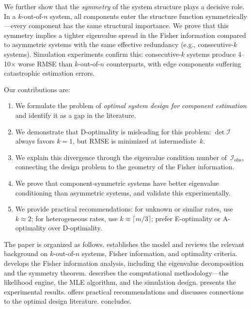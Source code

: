\documentclass[12pt]{article}
\theoremstyle{definition}
\theoremstyle{remark}
\begin{document}
We further show that the \emph{symmetry} of the system structure plays
a decisive role.  In a $k$-out-of-$n$ system, all components enter the
structure function symmetrically---every component has the same
structural importance.  We prove that this symmetry implies a tighter
eigenvalue spread in the Fisher information compared to asymmetric
systems with the same effective redundancy (e.g., consecutive-$k$
systems).  Simulation experiments confirm this: consecutive-$k$
systems produce 4--10$\times$ worse RMSE than $k$-out-of-$n$
counterparts, with edge components suffering catastrophic estimation
errors.

Our contributions are:
\begin{enumerate}
  \item We formulate the problem of \emph{optimal system design for
    component estimation} and identify it as a gap in the literature.
  \item We demonstrate that D-optimality is misleading for this
    problem: $\det \mathcal{I}$ always favors $k = 1$, but RMSE is
    minimized at intermediate~$k$.
  \item We explain this divergence through the eigenvalue condition
    number of~$\mathcal{I}_{\mathrm{obs}}$, connecting the design
    problem to the geometry of the Fisher information.
  \item We prove that component-symmetric systems have better
    eigenvalue conditioning than asymmetric systems, and validate
    this experimentally.
  \item We provide practical recommendations: for unknown or similar
    rates, use $k \approx 2$; for heterogeneous rates, use
    $k \approx \lceil m/3 \rceil$; prefer E-optimality or
    A-optimality over D-optimality.
\end{enumerate}

The paper is organized as follows.   establishes the
model and reviews the relevant background on $k$-out-of-$n$ systems,
Fisher information, and optimality criteria.  
develops the Fisher information analysis, including the eigenvalue
decomposition and the symmetry theorem.   describes
the computational methodology---the likelihood engine, the MLE
algorithm, and the simulation design.   presents
the experimental results.   offers practical
recommendations and discusses connections to the optimal design
literature.   concludes.


\end{document}
